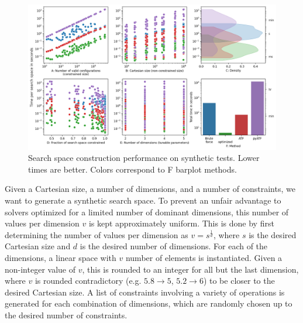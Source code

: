 \begin{figure}[!htb]
    \centering
    \includegraphics[width=1.0\textwidth]{ics25template/figures/searchspace_construction/results_synthetic.png}
    \caption{Search space construction performance on synthetic tests. Lower times are better. Colors correspond to F barplot methods.}
    \label{fig:results_synthetic}
\end{figure}

Given a Cartesian size, a number of dimensions, and a number of constraints, we want to generate a synthetic search space. 
To prevent an unfair advantage to solvers optimized for a limited number of dominant dimensions, this number of values per dimension $v$ is kept approximately uniform. 
This is done by first determining the number of values per dimension as $v = s^{\frac{1}{d}}$, where $s$ is the desired Cartesian size and $d$ is the desired number of dimensions. 
For each of the dimensions, a linear space with $v$ number of elements is instantiated. 
Given a non-integer value of $v$, this is rounded to an integer for all but the last dimension, where $v$ is rounded contradictory (e.g. $5.8 \rightarrow 5$, $5.2 \rightarrow 6$) to be closer to the desired Cartesian size. 
A list of constraints involving a variety of operations is generated for each combination of dimensions, which are randomly chosen up to the desired number of constraints. 


